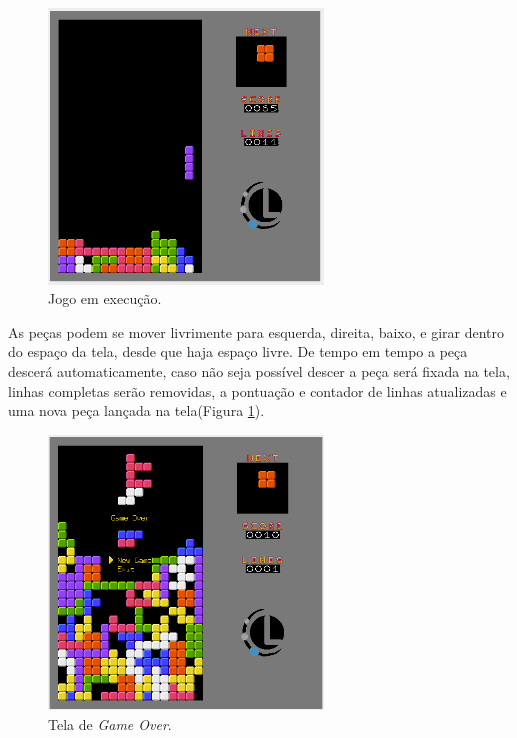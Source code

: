 \documentclass{article}
\begin{document}
\begin{figure}[H]
  \begin{center}
    \includegraphics[width=0.65\textwidth]{images/InGame.png} %
    \caption{Jogo em execução.}
    \label{InGame}
  \end{center}
\end{figure}

As peças podem se mover livrimente para esquerda, direita, baixo, e girar dentro do espaço da tela, desde que haja espaço livre.
De tempo em tempo a peça descerá automaticamente, caso não seja possível descer a peça será fixada na tela, linhas completas serão removidas, a pontuação e contador de linhas atualizadas e uma nova peça lançada na tela(Figura \ref{InGame}).

\begin{figure}[H]
  \begin{center}
    \includegraphics[width=0.65\textwidth]{images/GameOver.png} %
    \caption{Tela de \textit{Game Over}.}
    \label{GameOver}
  \end{center}
\end{figure}
\end{document}
